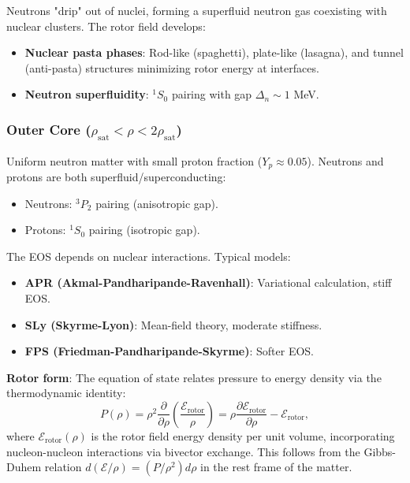 \documentclass[12pt,a4paper]{article}
\theoremstyle{definition}
\theoremstyle{remark}
\begin{document}
Neutrons "drip" out of nuclei, forming a superfluid neutron gas coexisting with nuclear clusters. The rotor field develops:
\begin{itemize}
\item \textbf{Nuclear pasta phases}: Rod-like (spaghetti), plate-like (lasagna), and tunnel (anti-pasta) structures minimizing rotor energy at interfaces.
\item \textbf{Neutron superfluidity}: $^1S_0$ pairing with gap $\Delta_n \sim 1$ MeV.
\end{itemize}

\subsubsection{Outer Core ($\rho_{\text{sat}} < \rho < 2\rho_{\text{sat}}$)}

Uniform neutron matter with small proton fraction ($Y_p \approx 0.05$). Neutrons and protons are both superfluid/superconducting:
\begin{itemize}
\item Neutrons: $^3P_2$ pairing (anisotropic gap).
\item Protons: $^1S_0$ pairing (isotropic gap).
\end{itemize}

The EOS depends on nuclear interactions. Typical models:
\begin{itemize}
\item \textbf{APR (Akmal-Pandharipande-Ravenhall)}: Variational calculation, stiff EOS.
\item \textbf{SLy (Skyrme-Lyon)}: Mean-field theory, moderate stiffness.
\item \textbf{FPS (Friedman-Pandharipande-Skyrme)}: Softer EOS.
\end{itemize}

\textbf{Rotor form}:
The equation of state relates pressure to energy density via the thermodynamic identity:
\begin{equation}
P(\rho) = \rho^2 \frac{\partial}{\partial \rho}\left(\frac{\mathcal{E}_{\text{rotor}}}{\rho}\right) = \rho \frac{\partial \mathcal{E}_{\text{rotor}}}{\partial \rho} - \mathcal{E}_{\text{rotor}},
\end{equation}
where $\mathcal{E}_{\text{rotor}}(\rho)$ is the rotor field energy density per unit volume, incorporating nucleon-nucleon interactions via bivector exchange. This follows from the Gibbs-Duhem relation $d(\mathcal{E}/\rho) = (P/\rho^2)d\rho$ in the rest frame of the matter.
\end{document}
